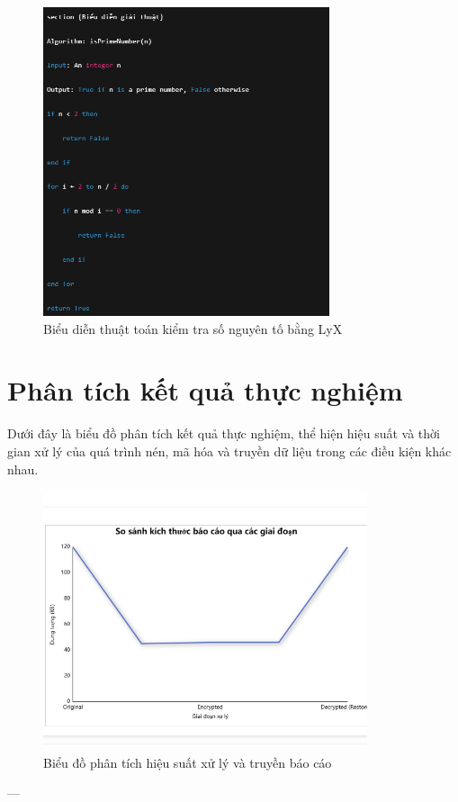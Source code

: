 \begin{figure}[H]
    \centering
    \includegraphics[width=0.75\textwidth]{figs/LyX.PNG}
    \caption{Biểu diễn thuật toán kiểm tra số nguyên tố bằng LyX}
\end{figure}

\section{Phân tích kết quả thực nghiệm}

Dưới đây là biểu đồ phân tích kết quả thực nghiệm, thể hiện hiệu suất và thời gian xử lý của quá trình nén, mã hóa và truyền dữ liệu trong các điều kiện khác nhau.

\begin{figure}[H]
    \centering
    \includegraphics[width=0.85\textwidth]{figs/ICC_plots.pdf}
    \caption{Biểu đồ phân tích hiệu suất xử lý và truyền báo cáo}
\end{figure}


---

